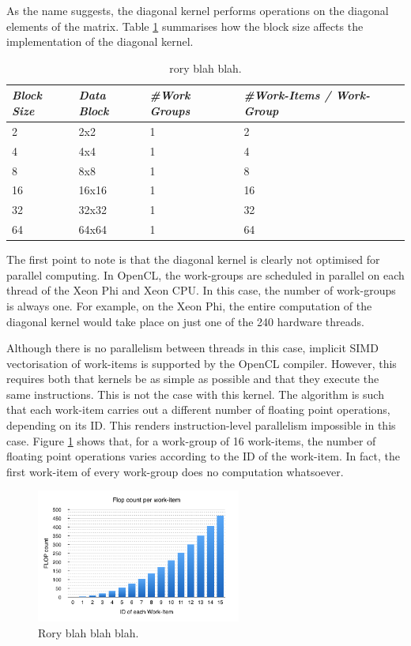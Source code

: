 \par{As the name suggests, the diagonal kernel performs operations on the diagonal elements of the matrix. 
    Table \ref{tab:lu1} summarises how the block size affects the implementation of the diagonal kernel.}

\begin{table}[!h]
    \centering
    \begin{tabular}{| l | l | l | l |}
    \hline
    \emph{Block Size} & \emph{Data Block} & \emph{\#Work Groups} & \emph{\#Work-Items / Work-Group} \\ \hline
    2 & 2x2 & 1 & 2 \\ \hline
    4 & 4x4 & 1 & 4 \\ \hline
    8 & 8x8 & 1 & 8 \\ \hline
    16 & 16x16 & 1 & 16 \\ \hline
    32 & 32x32 & 1 & 32 \\ \hline
    64 & 64x64 & 1 & 64\\ \hline
    \end{tabular}
    \caption{rory blah blah.}
    \label{tab:lu1}
\end{table}

\par{The first point to note is that the diagonal kernel is clearly not optimised for parallel computing. 
    In OpenCL, the work-groups are scheduled in parallel on each thread of the Xeon Phi and Xeon CPU. 
    In this case, the number of work-groups is always one. For example, on the Xeon Phi, 
    the entire computation of the diagonal kernel would take place on just one of the 240 hardware threads.}

\par{Although there is no parallelism between threads in this case, implicit SIMD vectorisation of work-items is supported 
    by the OpenCL compiler. However, this requires both that kernels be as simple as possible and that they execute the same 
    instructions. This is not the case with this kernel. The algorithm is such that each work-item carries out a different 
    number of floating point operations, depending on its ID. This renders instruction-level parallelism impossible in this case. 
    Figure \ref{FlopCount} shows that, for a work-group of 16 work-items, the number of floating point operations varies according to 
    the ID of the work-item. In fact, the first work-item of every work-group does no computation whatsoever.}

\begin{figure}[!h]
    \centering
    \includegraphics[width=0.6\textwidth]{figures/FlopCount.png}
    \caption{Rory blah blah blah.}
    \label{FlopCount}
\end{figure}

